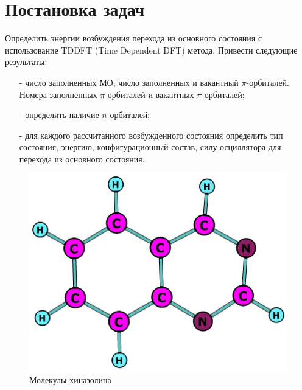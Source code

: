 \section{Постановка задач}
Определить энергии возбуждения перехода из основного состояния с использование TDDFT (Time Dependent DFT) метода. Привести следующие результаты:
\begin{itemize}
    \item[-] число заполненных МО, число заполненных и вакантный $\pi$-орбиталей. Номера заполненных $\pi$-орбиталей и вакантных $\pi$-орбиталей;
    \item[-] определить наличие $n$-орбиталей;
    \item[-] для каждого рассчитанного возбужденного состояния определить тип состояния, энергию, конфигурационный состав, силу осциллятора для перехода из основного состояния.
\end{itemize}

\begin{figure}[H]
\centering
\captionsetup{justification=centering}
\includegraphics[scale=0.4]{fig/1.jpg}
\caption{Молекулы хиназолина}
\end{figure}